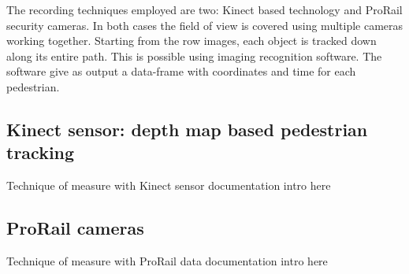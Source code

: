 \documentclass[class=article, crop=false]{standalone}
\begin{document}
The recording techniques employed are two: Kinect based technology and ProRail security cameras.
In both cases the field of view is covered using multiple cameras working together.
Starting from the row images, each object is tracked down along its entire path.
This is possible using imaging recognition software.
The software give as output a data-frame with coordinates and time for each pedestrian.

\subsection{Kinect sensor: depth map based pedestrian tracking}
Technique of measure with Kinect sensor documentation intro here

\subsection{ProRail cameras}
Technique of measure with ProRail data documentation intro here
\end{document}
